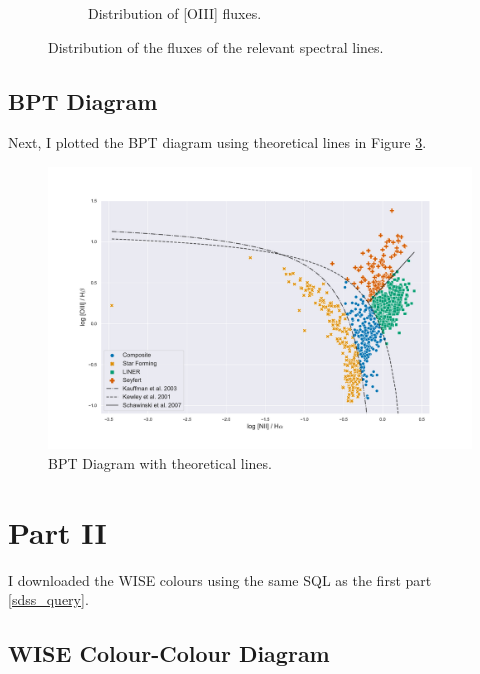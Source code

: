 \documentclass[letterpaper, oneside]{article}
\begin{document}
\begin{figure}[p]
\begin{subfigure}[b]{0.475\textwidth}
		\caption[]{Distribution of [OIII] fluxes.}
		\label{fig:distr_oiii}
	\end{subfigure}
	\caption{Distribution of the fluxes of the relevant spectral lines.} 
	\label{fig:flux_distributions}
\end{figure}

\subsection{BPT Diagram}\label{bpt_diagram_section}

Next, I plotted the BPT diagram using theoretical lines in Figure \ref{fig:BPT_line}.

\begin{figure}[h]
	\centering
	\includegraphics[width=1.1\textwidth]{../BPT_with_lines.pdf}
	\caption{BPT Diagram with theoretical lines.}
	\label{fig:BPT_line}
\end{figure}


\section{Part II}

I downloaded the WISE colours \cite{Wright_2010} using the same SQL as the first part \ref{sdss_query}.

\subsection{WISE Colour-Colour Diagram}

\cite{Jarrett_2017}
\end{document}
